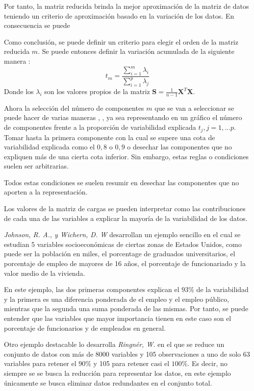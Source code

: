 \noindent Por tanto, la matriz reducida brinda la mejor aproximación de la matriz de datos teniendo un criterio de aproximación basado en la variación de los datos. En consecuencia se puede 

\noindent Como conclusión, se puede definir un criterio para elegir el orden de la matriz reducida $m$. Se puede entonces definir la variación acumulada de la siguiente manera \cite{Chatfield 1989}:
\begin{equation}
t_m=\dfrac{\sum_{i=1}^{m}\lambda_i}{\sum_{i=1}^{p}\lambda_j}
\end{equation}
\noindent Donde los $\lambda_i$ son los valores propios de la matriz $\textbf{S}=\frac{1}{n-1}\textbf{X}^T\textbf{X}$.

\noindent Ahora la selección del número de componentes $m$ que se van a seleccionar se puede hacer de varias maneras \cite{Peña 2002}, \cite{Jollife 1986}, ya sea representando en un gráfico el número de componentes frente a la proporción de variabilidad explicada $t_j, j=1,\ldots p$. Tomar hasta la primera componente con la cual se supere una cota de variabilidad explicada como el $0,8$ o $0,9$ \cite {Jollife 1986} o desechar las componentes que no expliquen más de una cierta cota inferior. Sin embargo, estas reglas o condiciones suelen ser arbitrarias.

\noindent Todos estas condiciones se suelen resumir en desechar las componentes que no aporten a la representación. 

\noindent Los valores de la matriz de cargas se pueden interpretar como las contribuciones de cada una de las variables a explicar la mayoría de la variabilidad de los datos.

\noindent\emph{Johnson, R. A., y Wichern, D. W} \cite{Johnson 2007} desarrollan un ejemplo sencillo en el cual se estudian 5 variables socioeconómicas de ciertas zonas de Estados Unidos, como puede ser la población en miles, el porcentage de graduados universitarios, el porcentaje de empleo de mayores de 16 años, el porcentaje de funcionariado y la valor medio de la vivienda.

\noindent En este ejemplo, las dos primeras componentes explican el $93\%$ de la variabilidad y la primera es una diferencia ponderada de el empleo y el empleo público, mientras que la segunda una suma ponderada de las mismas. Por tanto, se puede entender que las variables que mayor importancia tienen en este caso son el porcentaje de funcionarios y de empleados en general.

\noindent Otro ejemplo destacable lo desarrolla \emph{Ringnér, W.}\cite{Ringnér 2008} en el que se reduce un conjunto de datos con más de 8000 variables y 105 observaciones a uno de solo 63 variables para retener el $90\%$ y 105 para retener casi el $100\%$. Es decir, no siempre se se busca la reducción para representar los datos, en este ejemplo únicamente se busca eliminar datos redundantes en el conjunto total. 

